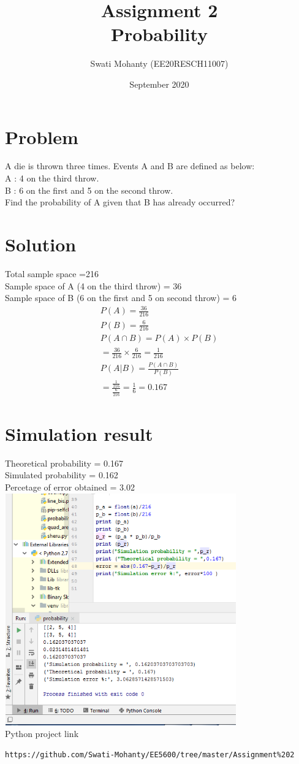 \documentclass[journal,12pt,twocolumn]{IEEEtran}
\title{Assignment 2
\\Probability }
\author{Swati Mohanty (EE20RESCH11007) }
\date{September 2020}
\begin{document}
\maketitle


\section{Problem}
A die is thrown three times. Events A and B are defined as below:
\\A : 4 on the third throw.
\\B : 6 on the first and 5 on the second throw.
\\Find the probability of A given that B has
already occurred?
\section{Solution}
Total sample space =216
\\Sample space of A (4 on the third throw) = 36
\\Sample space of B (6 on the first and 5 on  second throw) = 6
\begin{align}
    P(A) = \frac{36}{216}
    \\
    P(B) = \frac{6}{216}
    \\
P(A\cap B) = P(A) \times P(B)  
\\= \frac{36}{216} \times \frac{6}{216} = \frac{1}{216}
\\
    P(A | B) = \frac{P(A\cap B)}{P(B)}
    \\
    =\frac{\frac{1}{216}}{\frac{6}{216}} = \frac{1}{6} = 0.167
\end{align}
\section{Simulation result}
Theoretical probability = 0.167
\\Simulated probability = 0.162
\\Percetage of error obtained = 3.02%
\\\includegraphics[width=10cm, height=10cm]{simulation result.png}
\\Python project link 
\begin{lstlisting}
https://github.com/Swati-Mohanty/EE5600/tree/master/Assignment%202
\end{lstlisting}
\end{document}
